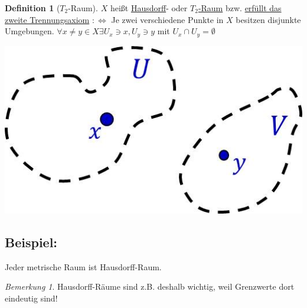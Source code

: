 \documentclass[a4paper,11pt,notitlepage]{report}
\theoremstyle{remark}
\newtheorem{remark}{Bemerkung}[chapter]
\theoremstyle{definition}
\newtheorem{definition}{Definition}[chapter]
\newenvironment{bsp}[1]
{
\setlength{\fboxsep}{10pt}
\subsection*{Beispiel: #1}
\begin{upshape}
}
{
\end{upshape}
}
\begin{document}
\begin{definition}[$T_2$-Raum]
	$X$ heißt \underline{Hausdorff}- oder \underline{$T_2$-Raum} bzw. \underline{erfüllt das zweite Trennungsaxiom} $:\Leftrightarrow$ Je zwei verschiedene Punkte in $X$ besitzen disjunkte Umgebungen.
	\newline
	$\forall x \neq y \in X \exists U_x \ni x, U_y \ni y$ mit $U_x \cap U_y = \emptyset$
\end{definition}
\begin{center}
\includegraphics[scale=0.4]{images/T2.jpg}
\end{center}

\begin{bsp}{}
	Jeder metrische Raum ist Hausdorff-Raum.
\end{bsp}

\begin{remark}
Hausdorff-Räume sind z.B. deshalb wichtig, weil Grenzwerte dort eindeutig sind!
\end{remark}
\end{document}

